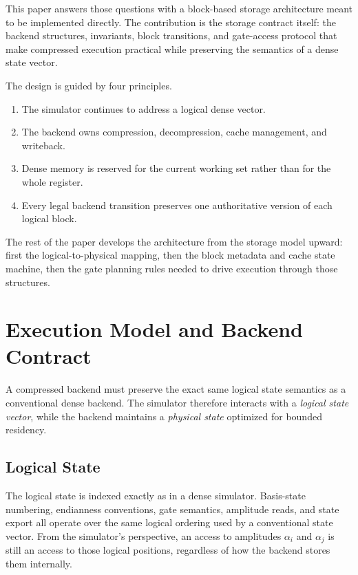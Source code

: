 \documentclass[runningheads]{llncs}
\begin{document}
This paper answers those questions with a block-based storage architecture meant to be implemented directly. The contribution is the storage contract itself: the backend structures, invariants, block transitions, and gate-access protocol that make compressed execution practical while preserving the semantics of a dense state vector.

The design is guided by four principles.
\begin{enumerate}[leftmargin=1.5em]
  \item The simulator continues to address a logical dense vector.
  \item The backend owns compression, decompression, cache management, and writeback.
  \item Dense memory is reserved for the current working set rather than for the whole register.
  \item Every legal backend transition preserves one authoritative version of each logical block.
\end{enumerate}

The rest of the paper develops the architecture from the storage model upward: first the logical-to-physical mapping, then the block metadata and cache state machine, then the gate planning rules needed to drive execution through those structures.

\section{Execution Model and Backend Contract}

A compressed backend must preserve the exact same logical state semantics as a conventional dense backend. The simulator therefore interacts with a \emph{logical state vector}, while the backend maintains a \emph{physical state} optimized for bounded residency.

\subsection{Logical State}

The logical state is indexed exactly as in a dense simulator. Basis-state numbering, endianness conventions, gate semantics, amplitude reads, and state export all operate over the same logical ordering used by a conventional state vector. From the simulator's perspective, an access to amplitudes $\alpha_i$ and $\alpha_j$ is still an access to those logical positions, regardless of how the backend stores them internally.
\end{document}
